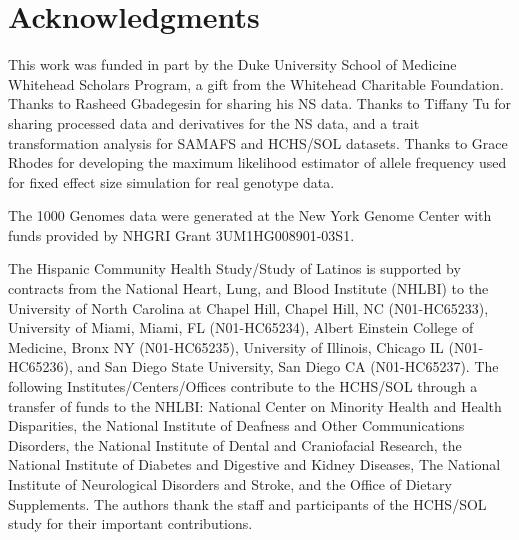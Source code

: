 \documentclass[11pt]{article}
\begin{document}
\section*{Acknowledgments}

This work was funded in part by the Duke University School of Medicine Whitehead Scholars Program, a gift from the Whitehead Charitable Foundation.
Thanks to Rasheed Gbadegesin for sharing his NS data.
Thanks to Tiffany Tu for sharing processed data and derivatives for the NS data, and a trait transformation analysis for SAMAFS and HCHS/SOL datasets.
Thanks to Grace Rhodes for developing the maximum likelihood estimator of allele frequency used for fixed effect size simulation for real genotype data.

The 1000 Genomes data were generated at the New York Genome Center with funds provided by NHGRI Grant 3UM1HG008901-03S1.

The Hispanic Community Health Study/Study of Latinos is supported by contracts from the National Heart, Lung, and Blood Institute (NHLBI) to the University of North Carolina at Chapel Hill, Chapel Hill, NC (N01-HC65233), University of Miami, Miami, FL (N01-HC65234), Albert Einstein College of Medicine, Bronx NY (N01-HC65235), University of Illinois, Chicago IL (N01-HC65236), and San Diego State University, San Diego CA (N01-HC65237). The following Institutes/Centers/Offices contribute to the HCHS/SOL through a transfer of funds to the NHLBI: National Center on Minority Health and Health Disparities, the National Institute of Deafness and Other Communications Disorders, the National Institute of Dental and Craniofacial Research, the National Institute of Diabetes and Digestive and Kidney Diseases, The National Institute of Neurological Disorders and Stroke, and the Office of Dietary Supplements. The authors thank the staff and participants of the HCHS/SOL study for their important contributions.
\end{document}
